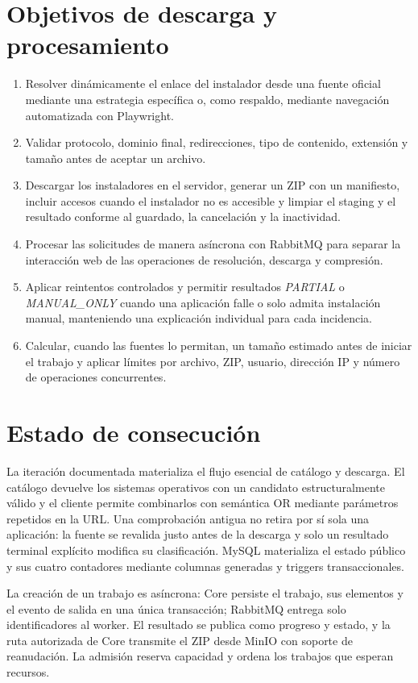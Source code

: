 \section{Objetivos de descarga y procesamiento}

\begin{enumerate}
	\item Resolver dinámicamente el enlace del instalador desde una fuente oficial mediante una estrategia específica o, como respaldo, mediante navegación automatizada con Playwright.
	\item Validar protocolo, dominio final, redirecciones, tipo de contenido, extensión y tamaño antes de aceptar un archivo.
	\item Descargar los instaladores en el servidor, generar un ZIP con un manifiesto, incluir accesos  cuando el instalador no es accesible y limpiar el staging y el resultado conforme al guardado, la cancelación y la inactividad.
	\item Procesar las solicitudes de manera asíncrona con RabbitMQ para separar la interacción web de las operaciones de resolución, descarga y compresión.
	\item Aplicar reintentos controlados y permitir resultados \emph{PARTIAL} o \emph{MANUAL\_ONLY} cuando una aplicación falle o solo admita instalación manual, manteniendo una explicación individual para cada incidencia.
	\item Calcular, cuando las fuentes lo permitan, un tamaño estimado antes de iniciar el trabajo y aplicar límites por archivo, ZIP, usuario, dirección IP y número de operaciones concurrentes.
\end{enumerate}

\section{Estado de consecución}

La iteración documentada materializa el flujo esencial de catálogo y descarga. El catálogo devuelve los sistemas operativos con un candidato estructuralmente válido y el cliente permite combinarlos con semántica OR mediante parámetros repetidos en la URL. Una comprobación antigua no retira por sí sola una aplicación: la fuente se revalida justo antes de la descarga y solo un resultado terminal explícito modifica su clasificación. MySQL materializa el estado público y sus cuatro contadores mediante columnas generadas y triggers transaccionales.

La creación de un trabajo es asíncrona: Core persiste el trabajo, sus elementos y el evento de salida en una única transacción; RabbitMQ entrega solo identificadores al worker. El resultado se publica como progreso y estado, y la ruta autorizada de Core transmite el ZIP desde MinIO con soporte de reanudación. La admisión reserva capacidad y ordena los trabajos que esperan recursos.

